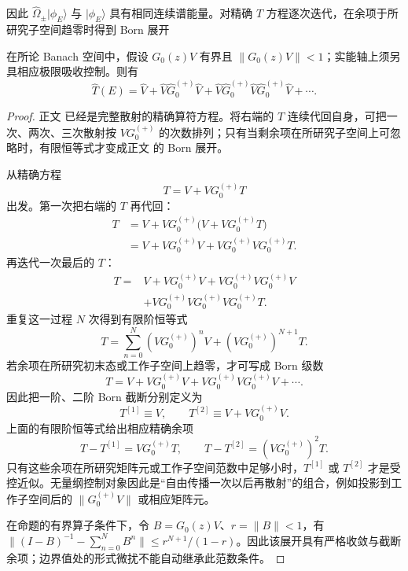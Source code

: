 因此 $\hat\Omega_\pm|\phi_E\rangle$ 与 $|\phi_E\rangle$ 具有相同连续谱能量。对精确 $T$ 方程逐次迭代，在余项于所研究子空间趋零时得到 Born 展开


\begin{proposition}
在所论 Banach 空间中，假设 $G_0(z)V$ 有界且 $\|G_0(z)V\|<1$；实能轴上须另具相应极限吸收控制。则有
\begin{equation}
 {
 \hat T(E)=\hat V+\hat V\hat G_0^{(+)}\hat V
 +\hat V\hat G_0^{(+)}\hat V\hat G_0^{(+)}\hat V+\cdots.}
\label{eq:born-series-r68}
\end{equation}
\end{proposition}
\begin{proof}
正文 已经是完整散射的精确算符方程。将右端的 $T$ 连续代回自身，可把一次、两次、三次散射按 $V G_0^{(+)}$ 的次数排列；只有当剩余项在所研究子空间上可忽略时，有限恒等式才变成正文 的 Born 展开。


从精确方程
\begin{equation*}
T=V+VG_0^{(+)}T
\end{equation*}
出发。第一次把右端的 $T$ 再代回：
\begin{align*}
T
&=V+VG_0^{(+)}\big(V+VG_0^{(+)}T\big)\\
&=V+VG_0^{(+)}V+VG_0^{(+)}VG_0^{(+)}T.
\end{align*}
再迭代一次最后的 $T$：
\begin{align*}
T
={}&V+VG_0^{(+)}V+VG_0^{(+)}VG_0^{(+)}V\\
&+VG_0^{(+)}VG_0^{(+)}VG_0^{(+)}T.
\end{align*}
重复这一过程 $N$ 次得到有限阶恒等式
\begin{equation*}
T=\sum_{n=0}^{N}(VG_0^{(+)})^nV+(VG_0^{(+)})^{N+1}T.
\end{equation*}
若余项在所研究初末态或工作子空间上趋零，才可写成 Born 级数
\begin{equation*}
T=V+VG_0^{(+)}V+VG_0^{(+)}VG_0^{(+)}V+\cdots.
\end{equation*}
因此把一阶、二阶 Born 截断分别定义为
\begin{equation*}
T^{[1]}\equiv V,
\qquad
T^{[2]}\equiv V+VG_0^{(+)}V.
\end{equation*}
上面的有限阶恒等式给出相应精确余项
\begin{equation*}
T-T^{[1]}=VG_0^{(+)}T,
\qquad
T-T^{[2]}=(VG_0^{(+)})^2T.
\end{equation*}
只有这些余项在所研究矩阵元或工作子空间范数中足够小时，$T^{[1]}$ 或 $T^{[2]}$ 才是受控近似。无量纲控制对象因此是“自由传播一次以后再散射”的组合，例如投影到工作子空间后的 $\|G_0^{(+)}V\|$ 或相应矩阵元。

在命题的有界算子条件下，令 $B=G_0(z)V$、$r=\|B\|<1$，有 $\|(I-B)^{-1}-\sum_{n=0}^N B^n\|\le r^{N+1}/(1-r)$。因此该展开具有严格收敛与截断余项；边界值处的形式微扰不能自动继承此范数条件。
\end{proof}


